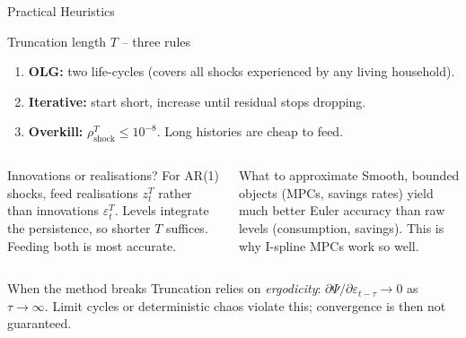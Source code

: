 \documentclass[aspectratio=169,11pt]{beamer}
\newcommand{\emphc}[1]{\textcolor{harvardcrimson}{#1}}
\begin{document}
\begin{frame}{Practical Heuristics}
\small
\begin{block}{Truncation length $T$ -- three rules}
{\footnotesize
\begin{enumerate}\itemsep1pt
    \item \textbf{OLG:} two life-cycles (covers all shocks experienced by any living household).
    \item \textbf{Iterative:} start short, increase until residual stops dropping.
    \item \textbf{Overkill:} $\rho_{\text{shock}}^T \le 10^{-8}$.  Long histories are cheap to feed.
\end{enumerate}}
\end{block}

\begin{columns}[T]
\begin{block}{Innovations or realisations?}
{\footnotesize For AR(1) shocks, feed \emphc{realisations} $z_t^T$ rather than innovations $\varepsilon_t^T$.  Levels integrate the persistence, so shorter $T$ suffices.  Feeding both is most accurate.}
\end{block}

\begin{block}{What to approximate}
{\footnotesize Smooth, bounded objects (\emphc{MPCs, savings rates}) yield much better Euler accuracy than raw levels (consumption, savings).  This is why I-spline MPCs work so well.}
\end{block}
\end{columns}

\begin{alertblock}{When the method breaks}
{\footnotesize Truncation relies on \emph{ergodicity}: $\partial\Psi/\partial\varepsilon_{t-\tau}\to 0$ as $\tau\to\infty$.  Limit cycles or deterministic chaos violate this; convergence is then not guaranteed.}
\end{alertblock}
\end{frame}
\end{document}
